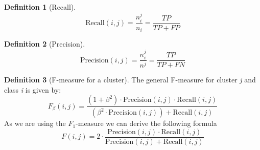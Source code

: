 \documentclass[a4paper,10pt]{article}
\theoremstyle{plain}
\theoremstyle{definition}
\newtheorem{defn}{Definition}
\begin{document}
\begin{defn}[Recall]\label{}
	\begin{equation}
		\text{Recall}(i,j) = \frac{n_{i}^{j}}{n_i} = \frac{TP}{TP + FP}
	\end{equation}
\end{defn}

\begin{defn}[Precision]\label{}
	\begin{equation}
		\text{Precision}(i,j) = \frac{n_{i}^{j}}{n^j} = \frac{TP}{TP + FN}
	\end{equation}
\end{defn}

\begin{defn}[F-measure for a cluster]\label{}
	The general F-measure for cluster \textit{j} and class \textit{i} is given by:
		\begin{equation}
			F_\beta (i, j) = \frac{(1 + \beta^2) \cdot \text{Precision}(i, j) \cdot \text{Recall}(i, j)}{(\beta^2 \cdot \text{Precision}(i, j)) + \text{Recall}(i, j)}
		\end{equation}
	As we are using the $F_1$-measure we can derive the following formula 
	\begin{equation}
		F(i,j) = 2 \cdot \frac{\text{Precision}(i,j) \cdot \text{Recall}(i,j)}{\text{Precision}(i,j) + \text{Recall}(i,j)}
	\end{equation}
\end{defn}
\end{document}
